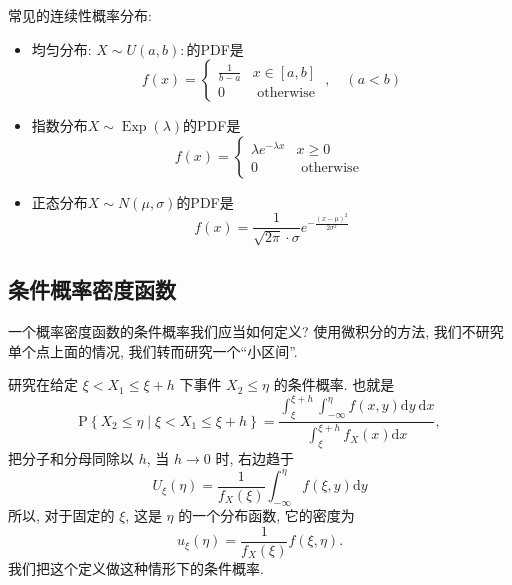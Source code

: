 \begin{takeaway}
    常见的连续性概率分布: 
    \begin{itemize}
        \item 均匀分布: $X\sim U(a, b): $的PDF是$$
        f(x)=\left\{\begin{array}{ll}
        \frac{1}{b-a} & x \in[a, b] \\
        0 & \text { otherwise }
        \end{array}, \quad(a<b)\right.
        $$
        \item 指数分布${X} \sim \operatorname{Exp}(\lambda)$的PDF是$$
        f(x)= \begin{cases}\lambda e^{-\lambda x} & x \geq 0 \\ 0 & \text { otherwise }\end{cases}
        $$
        \item 正态分布$X\sim N(\mu,\sigma)$的PDF是$$
        f(x)=\frac{1}{\sqrt{2 \pi} \cdot \sigma} e^{-\frac{(x-\mu)^2}{2 \sigma^2}}
        $$
    \end{itemize}
\end{takeaway}

\subsection{条件概率密度函数}

一个概率密度函数的条件概率我们应当如何定义? 使用微积分的方法, 我们不研究单个点上面的情况, 我们转而研究一个``小区间''.

研究在给定 $\xi<X_1 \leq \xi+h$ 下事件 $X_2 \leq \eta$ 的条件概率. 也就是$$\mathrm{P}\left\{X_2 \leq \eta \mid \xi<X_1 \leq \xi+h\right\}=\frac{\int_{\xi}^{\xi+h}  \int_{-\infty}^\eta f(x, y) \mathrm{d} y\mathrm{~d} x}{\int_{\xi}^{\xi+h} f_X(x) \mathrm{d} x},$$ 把分子和分母同除以 $h$, 当 $h \rightarrow 0$ 时, 右边趋于$$U_{\xi}(\eta)=\frac{1}{f_X(\xi)} \int_{-\infty}^\eta f(\xi, y) \mathrm{d} y$$
所以, 对于固定的 $\xi$, 这是 $\eta$ 的一个分布函数, 它的密度为$$u_{\xi}(\eta)=\frac{1}{f_X(\xi)} f(\xi, \eta).$$ 我们把这个定义做这种情形下的条件概率. 

